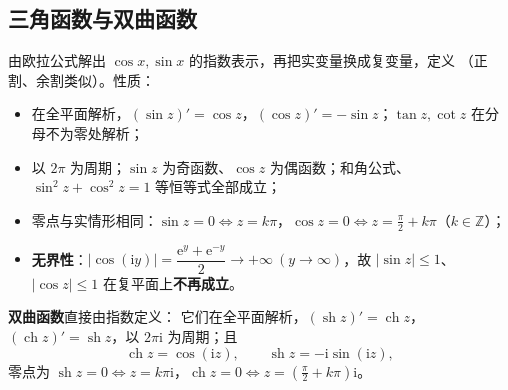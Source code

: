 \subsection{三角函数与双曲函数}
由欧拉公式解出 \(\cos x,\sin x\) 的指数表示，再把实变量换成复变量，定义
（正割、余割类似）。性质：
\begin{itemize}[leftmargin=2em]
  \item 在全平面解析，\((\sin z)'=\cos z\)，\((\cos z)'=-\sin z\)；\(\tan z,\cot z\) 在分母不为零处解析；
  \item 以 \(2\pi\) 为周期；\(\sin z\) 为奇函数、\(\cos z\) 为偶函数；和角公式、\(\sin^{2}z+\cos^{2}z=1\) 等恒等式全部成立；
  \item 零点与实情形相同：\(\sin z=0\iff z=k\pi\)，\(\cos z=0\iff z=\frac{\pi}{2}+k\pi\)（\(k\in\mathbb{Z}\)）；
  \item \textbf{无界性}：\(|\cos(\mathrm{i}y)|=\dfrac{\mathrm{e}^{y}+\mathrm{e}^{-y}}{2}\to+\infty\ (y\to\infty)\)，故 \(|\sin z|\leqslant 1\)、\(|\cos z|\leqslant 1\) 在复平面上\textbf{不再成立}。
\end{itemize}

\textbf{双曲函数}直接由指数定义：
它们在全平面解析，\((\operatorname{sh}z)'=\operatorname{ch}z\)，\((\operatorname{ch}z)'=\operatorname{sh}z\)，以 \(2\pi\mathrm{i}\) 为周期；且
\[
\operatorname{ch}z=\cos(\mathrm{i}z),\qquad \operatorname{sh}z=-\mathrm{i}\sin(\mathrm{i}z),
\]
零点为 \(\operatorname{sh}z=0\iff z=k\pi\mathrm{i}\)，\(\operatorname{ch}z=0\iff z=\left(\frac{\pi}{2}+k\pi\right)\mathrm{i}\)。


